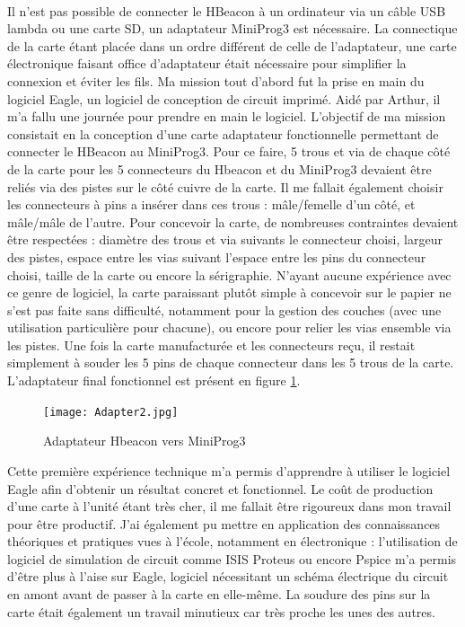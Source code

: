 \documentclass[12pt]{report}
\begin{document}
\paragraph{}
Il n'est pas possible de connecter le HBeacon à un ordinateur via un câble USB lambda ou une carte SD, un adaptateur MiniProg3 est nécessaire. La connectique de la carte étant placée dans un ordre différent de celle de l'adaptateur, une carte électronique faisant office d'adaptateur était nécessaire pour simplifier la connexion et éviter les fils. 
Ma mission tout d'abord fut la prise en main du logiciel Eagle, un logiciel de conception de circuit imprimé. Aidé par Arthur, il m'a fallu une journée pour prendre en main le logiciel. 
L'objectif de ma mission consistait en la conception d'une carte adaptateur fonctionnelle permettant de connecter le HBeacon au MiniProg3. Pour ce faire, 5 trous et via de chaque côté de la carte pour les 5 connecteurs du Hbeacon et du MiniProg3 devaient être reliés via des pistes sur le côté cuivre de la carte. Il me fallait également choisir les connecteurs à pins a insérer dans ces trous : mâle/femelle d'un côté, et mâle/mâle de l'autre. Pour concevoir la carte, de nombreuses contraintes devaient être respectées : diamètre des trous et via suivants le connecteur choisi, largeur des pistes, espace entre les vias suivant l'espace entre les pins du connecteur choisi, taille de la carte ou encore la sérigraphie. N'ayant aucune expérience avec ce genre de logiciel, la carte paraissant plutôt simple à concevoir sur le papier ne s'est pas faite sans difficulté, notamment pour la gestion des couches (avec une utilisation particulière pour chacune), ou encore pour relier les vias ensemble via les pistes.
Une fois la carte manufacturée et les connecteurs reçu, il restait simplement à souder les 5 pins de chaque connecteur dans les 5 trous de la carte. L'adaptateur final fonctionnel est présent en figure \ref{Adaptateur Hbeacon vers MiniProg3}.

\begin{figure}[h!]
\begin{center}
\texttt{[image: Adapter2.jpg]}
\end{center}
\caption{Adaptateur Hbeacon vers MiniProg3}
\label{Adaptateur Hbeacon vers MiniProg3}
\end{figure}

Cette première expérience technique m'a permis d'apprendre à utiliser le logiciel Eagle afin d'obtenir un résultat concret et fonctionnel. Le coût de production d'une carte à l'unité étant très cher, il me fallait être rigoureux dans mon travail pour être productif. J'ai également pu mettre en application des connaissances théoriques et pratiques vues à l'école, notamment en électronique : l'utilisation de logiciel de simulation de circuit comme ISIS Proteus ou encore Pspice m'a permis d'être plus à l'aise sur Eagle, logiciel nécessitant un schéma électrique du circuit en amont avant de passer à la carte en elle-même. La soudure des pins sur la carte était également un travail minutieux car très proche les unes des autres.
\end{document}
